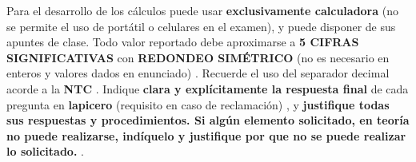 \documentclass[12pt]{article}
\begin{document}
Para el desarrollo de los cálculos puede usar \textbf{exclusivamente calculadora} (no se permite el uso de portátil o celulares en el examen), y %
puede disponer de sus apuntes de clase. %
Todo valor reportado debe aproximarse a \textbf{5 CIFRAS SIGNIFICATIVAS} con \textbf{REDONDEO SIMÉTRICO} (no es necesario en enteros y valores dados en enunciado)%
. Recuerde el uso del separador decimal acorde a la \textbf{NTC} %
.
Indique \textbf{clara y explícitamente la respuesta final} de cada pregunta %
en \textbf{lapicero} (requisito en caso de reclamación) %
, y \textbf{justifique todas sus respuestas y procedimientos. Si algún elemento solicitado, en teoría no puede realizarse, indíquelo y justifique por que no se puede realizar lo solicitado. %
}.
\end{document}
